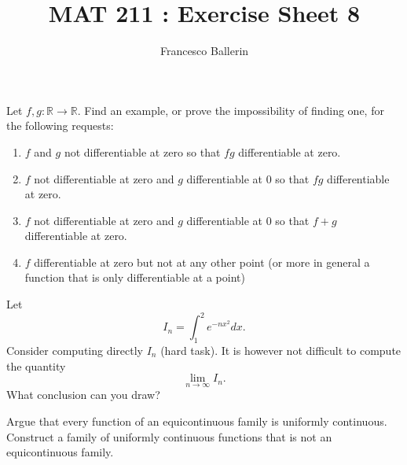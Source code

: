 \documentclass[11pt]{article}%
\title{MAT 211 : Exercise Sheet 8}
\author{Francesco Ballerin}
\date{\color{gray}{\small{francesco.ballerin@uib.no}}}
\newcommand{\R}{\mathbb{R}}
\begin{document}
\begin{minipage}[t]{\dimexpr \textwidth-6cm-\columnsep}
     \maketitle
\end{minipage}
\hfill\noindent{}

\vspace{50pt}

\begin{Exercise}[title={*}]
	Let $f,g:\R\to\R$. Find an example, or prove the impossibility of finding one, for the following requests:
	\begin{enumerate}
		\item $f$ and $g$ not differentiable at zero so that $fg$ differentiable at zero.
		\item $f$ not differentiable at zero and $g$  differentiable at 0 so that $fg$ differentiable at zero.
		\item $f$ not differentiable at zero and $g$ differentiable at 0 so that $f+g$ differentiable at zero.
		\item $f$ differentiable at zero but not at any other point (or more in general a function that is only differentiable at a point)
	\end{enumerate}
\end{Exercise}

\begin{Exercise}[title={*}]
	Let $$\displaystyle I_n=\int_{1}^2 e^{-nx^2} dx.$$ Consider computing directly $I_n$ (hard task). It is however not difficult to compute the quantity $$\lim_{n\to\infty} I_n.$$
	What conclusion can you draw?
\end{Exercise}

\begin{Exercise}[title={*}]
	Argue that every function of an equicontinuous family is uniformly continuous. Construct a family of uniformly continuous functions that is not an equicontinuous family.
\end{Exercise}
\end{document}
